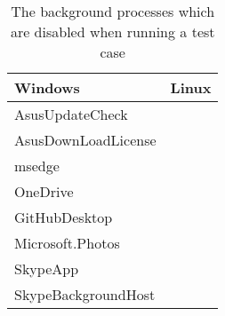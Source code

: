 \begin{table}[ht]
    \centering
    \begin{tabular}{| l | l |}
    \hline
    \textbf{Windows}    & \textbf{Linux}    \\ \hline
    AsusUpdateCheck     &   \\ \hline
    AsusDownLoadLicense &   \\ \hline
    msedge              &   \\ \hline
    OneDrive            &   \\ \hline
    GitHubDesktop       &   \\ \hline
    Microsoft.Photos    &   \\ \hline
    SkypeApp            &   \\ \hline
    SkypeBackgroundHost &   \\ \hline
    \end{tabular}
    \caption{The background processes which are disabled when running a test case}
    \label{tab:disabled_proc}
\end{table}